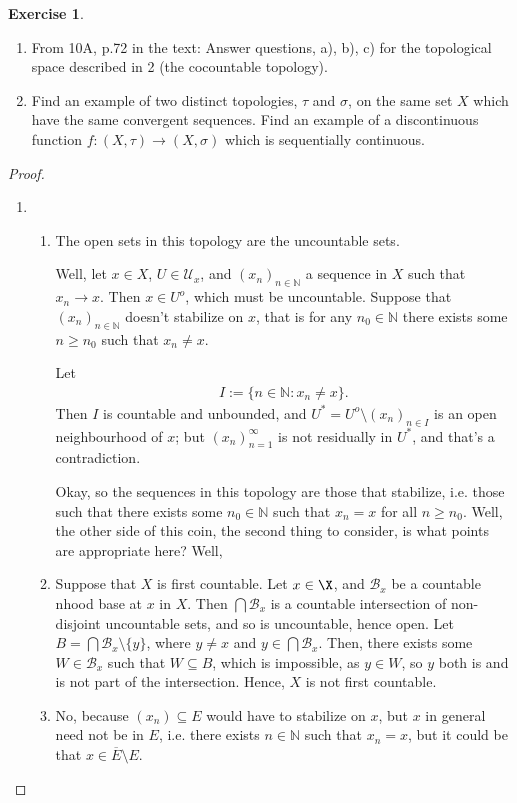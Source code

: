 \documentclass[12pt]{extarticle}
\newcommand{\set}[1]{\{#1\}}
\newcommand{\N}{\mathbb{N}}
\newcommand{\<}{\langle}
\renewcommand{\>}{\rangle}
\theoremstyle{definition}
\newtheorem{exercise}{Exercise}
\begin{document}
\begin{exercise}
  \begin{enumerate}
  \item
    From 10A, p.72 in the text: Answer questions, a), b), c) for the topological space described in 2 (the cocountable topology).
  \item
    Find an example of two distinct topologies, $\tau$ and $\sigma$, on the same set $X$ which have the same convergent sequences. Find an example of a discontinuous function $f:(X, \tau) \to (X, \sigma)$ which is sequentially continuous. 
  \end{enumerate}
\end{exercise}
\begin{proof}
  \begin{enumerate}
  \item
    \begin{enumerate}
    \item
      The open sets in this topology are the uncountable sets. 


      
      Well, let $x \in X$, $U \in \mathcal{U}_x$, and $(x_n)_{n \in \N}$ a sequence in $X$ such that $x_n \to x$.
      Then $x \in U^o$, which must be uncountable. Suppose that $(x_n)_{n \in \N}$ doesn't stabilize on $x$,
      that is for any $n_0 \in \N$ there exists some $n \geq n_0$ such that $x_n \neq x$.

      Let
      \begin{align*}
        I := \set{n \in \N: x_n \neq x}.
      \end{align*}
      Then $I$ is countable and unbounded, and $U^* = U^o \setminus (x_n)_{n \in I}$ is an open neighbourhood of $x$; but $(x_n)_{n=1}^{\infty}$
      is not residually in $U^*$, and that's a contradiction.

      Okay, so the sequences in this topology are those that stabilize, i.e. those such that there exists some $n_0 \in \N$
      such that $x_n = x$ for all $n \geq n_0$. Well, the other side of this coin, the second thing to consider, is what points are appropriate here?
      Well, 

    \item
      Suppose that $X$ is first countable. Let $x \in \X$, and $\mathcal{B}_x$ be a countable nhood base at $x$ in $X$.
      Then $\bigcap \mathcal{B}_x$ is a countable intersection of non-disjoint uncountable sets, and so is uncountable, hence open.
      Let $B = \bigcap \mathcal{B}_x \setminus \set{y}$, where $y \neq x$ and $y \in \bigcap \mathcal{B}_x$. Then, there exists some $W \in \mathcal{B}_x$
      such that $W \subseteq B$, which is impossible, as $y \in W$, so $y$ both is and is not part of the intersection.
      Hence, $X$ is not first countable.
    \item
      No, because $(x_n) \subseteq E$ would have to stabilize on $x$, but $x$ in general need not be in $E$, i.e. there exists $n \in \N$ such that $x_n=x$, but it could be that $x \in \overline{E} \setminus E$.


\end{enumerate}
\end{enumerate}
\end{proof}
\end{document}
